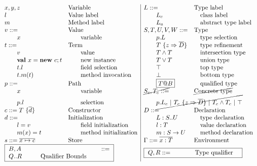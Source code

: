 \begin{figure}[htbp]
	\begin{equation*}
	\begin{array}{ll|ll}
		x,y,z & \text{Variable} &
			L::= & \text{Type label} \\
		l & \text{Value label} &
			\qquad L_c & \quad \text{class label} \\
		m & \text{Method label} &
			\qquad L_a & \quad \text{abstract type label} \\
		v::= & \text{Value} &
			S,T,U,V,W::= & \text{Type} \\
		\qquad x & \qquad \text{variable} &
			\qquad p.L & \quad \text{type selection} \\
		t::= & \text{Term} &
			\qquad T\ \{ z \Rightarrow \overline{D} \} & \quad \text{type refinement} \\
		\qquad v & \qquad \text{value} &
			\qquad T \land T & \quad \text{intersection type} \\
		\qquad {\bf val}\ x = {\bf new}\ c; t & \qquad \text{new instance} &
			\qquad T \lor T & \quad \text{union type} \\
		\qquad t.l & \qquad \text{field selection} & \qquad \top & \quad \text{top type} \\
		\qquad t.m(t) & \qquad \text{method invocation} &
			\qquad \bot & \quad \text{bottom type} \\
		p::= & \text{Path} &
			\qquad \boxed{T@B} & \quad \text{qualified type} \\
		\qquad x & \qquad \text{variable} &
			\cancel{S_c, T_c ::=} & \cancel{\text{Concrete type}} \\
		\qquad p.l & \qquad \text{selection} &
			\multicolumn{2}{l}{
			\qquad \cancel{p.L_c\ |
				\ T_c\ \{ z \Rightarrow \overline{D} \}\ |
				\ T_c \land T_c\ |
				\ \top}
			} \\
		c::=T\ \{\overline{d}\} & \text{Constructor} &
			D::= & \text{Declaration} \\
		d::= & \text{Initialization} &
			\qquad L:S..U & \quad \text{type declaration} \\
		\qquad l=v & \qquad \text{field initialization} &
			\qquad l:T & \quad \text{value declaration} \\
		\qquad m(x)=t & \qquad \text{method initialization} &
			\qquad m:S \rightarrow U & \quad \text{method declaration} \\
		s::=\overline{x \mapsto c} & \text{Store} &
			\Gamma ::= \overline{x:T} & \text{Environment} \\
	\multicolumn{2}{l|}{
				\fbox{
					\begin{minipage}{0.47\linewidth}
						$B,A::= Q..R \qquad \quad \text{Qualifier Bounds}$
					\end{minipage}
				}
				} &
			\multicolumn{2}{l}{
				\fbox{
					\begin{minipage}{0.43\linewidth}
						$Q,R::= \qquad \quad \ \ \text{Type qualifier}$
						

\end{minipage}}}
\end{array}
\end{equation*}
\end{figure}
